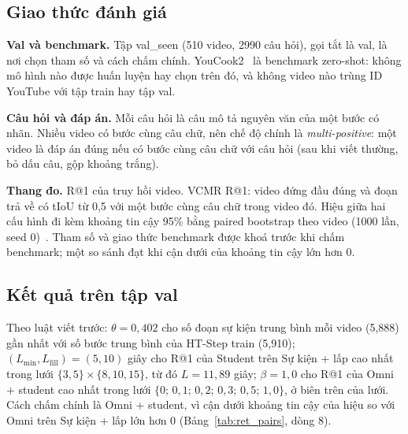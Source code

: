 \documentclass{IEEEtran}
\begin{document}
\subsection{Giao thức đánh giá}
\textbf{Val và benchmark.} Tập val\_seen (510 video, 2990 câu hỏi), gọi tắt là val, là nơi chọn tham số và cách chấm chính. YouCook2~\cite{youcook2} là benchmark zero-shot: không mô hình nào được huấn luyện hay chọn trên đó, và không video nào trùng ID YouTube với tập train hay tập val.

\textbf{Câu hỏi và đáp án.} Mỗi câu hỏi là câu mô tả nguyên văn của một bước có nhãn. Nhiều video có bước cùng câu chữ, nên chế độ chính là \emph{multi-positive}: một video là đáp án đúng nếu có bước cùng câu chữ với câu hỏi (sau khi viết thường, bỏ dấu câu, gộp khoảng trắng).

\textbf{Thang đo.} R@1 của truy hồi video. VCMR R@1: video đứng đầu đúng và đoạn trả về có tIoU từ 0,5 với một bước cùng câu chữ trong video đó. Hiệu giữa hai cấu hình đi kèm khoảng tin cậy 95\% bằng paired bootstrap theo video (1000 lần, seed 0)~\cite{bootstrap}. Tham số và giao thức benchmark được khoá trước khi chấm benchmark; một so sánh đạt khi cận dưới của khoảng tin cậy lớn hơn 0.

\subsection{Kết quả trên tập val}
Theo luật viết trước: $\theta = 0{,}402$ cho số đoạn sự kiện trung bình mỗi video (5,888) gần nhất với số bước trung bình của HT-Step train (5,910); $(L_{\min}, L_{\mathrm{fill}}) = (5, 10)$ giây cho R@1 của Student trên Sự kiện + lấp cao nhất trong lưới $\{3, 5\} \times \{8, 10, 15\}$, từ đó $L = 11{,}89$ giây; $\beta = 1{,}0$ cho R@1 của Omni + student cao nhất trong lưới $\{0;\,0{,}1;\,0{,}2;\,0{,}3;\,0{,}5;\,1{,}0\}$, ở biên trên của lưới. Cách chấm chính là Omni + student, vì cận dưới khoảng tin cậy của hiệu so với Omni trên Sự kiện + lấp lớn hơn 0 (Bảng~\ref{tab:ret_pairs}, dòng 8).
\end{document}

